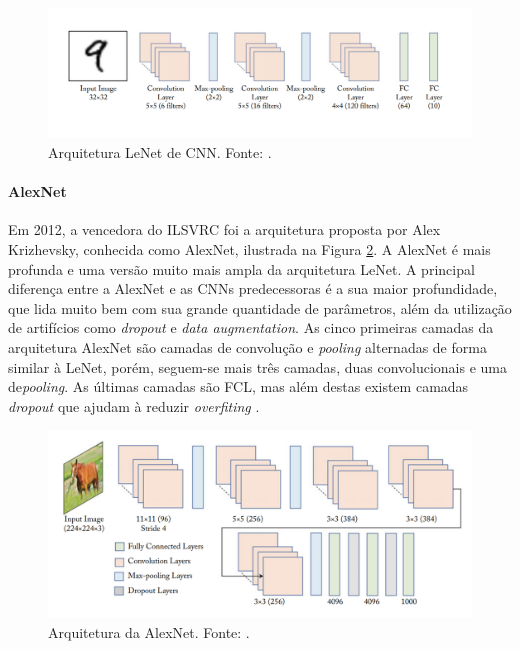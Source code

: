 \begin{figure}[!ht]
	\centering
	\caption{Arquitetura LeNet de CNN. Fonte: \cite{ref:khan}.}
	\label{img:lenet}
	\includegraphics[width=1\textwidth]{./img/lenet}
\end{figure}


\paragraph{AlexNet} Em 2012, a vencedora do ILSVRC foi a arquitetura proposta por Alex Krizhevsky, conhecida como AlexNet, ilustrada na Figura \ref{img:alexnet}. A AlexNet é mais profunda e uma versão muito mais ampla da arquitetura LeNet. A principal diferença entre a AlexNet e as CNNs predecessoras é a sua maior profundidade, que lida muito bem com sua grande quantidade de parâmetros, além da utilização de artifícios como \textit{dropout} e \textit{data augmentation}. As cinco primeiras camadas da arquitetura AlexNet são camadas de convolução e \textit{pooling} alternadas de forma similar à LeNet, porém, seguem-se mais três camadas, duas convolucionais e uma de\textit{pooling}. As últimas camadas são FCL, mas além destas existem camadas \textit{dropout} que ajudam à reduzir \textit{overfiting} \cite{ref:khan}.

\begin{figure}[!ht]
	\centering
	\caption{Arquitetura da AlexNet. Fonte: \cite{ref:khan}.}
	\label{img:alexnet}
	\includegraphics[width=1\textwidth]{./img/alexnet}
\end{figure}

